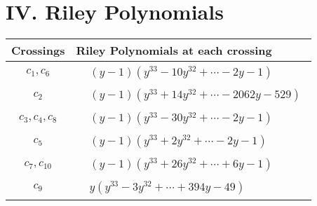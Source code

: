 \documentclass[1p]{elsarticle_modified}
\theoremstyle{definition}
\begin{document}
\centering \section*{ IV. Riley Polynomials}
\begin{tabular}{m{50pt}|m{274pt}}
Crossings & \hspace{64pt}Riley Polynomials at each crossing \\
\hline $$\begin{aligned}c_{1},c_{6}\end{aligned}$$&$\begin{aligned}
&(y-1)(y^{33}-10 y^{32}+\cdots-2 y-1)
\end{aligned}$\\
\hline $$\begin{aligned}c_{2}\end{aligned}$$&$\begin{aligned}
&(y-1)(y^{33}+14 y^{32}+\cdots-2062 y-529)
\end{aligned}$\\
\hline $$\begin{aligned}c_{3},c_{4},c_{8}\end{aligned}$$&$\begin{aligned}
&(y-1)(y^{33}-30 y^{32}+\cdots-2 y-1)
\end{aligned}$\\
\hline $$\begin{aligned}c_{5}\end{aligned}$$&$\begin{aligned}
&(y-1)(y^{33}+2 y^{32}+\cdots-2 y-1)
\end{aligned}$\\
\hline $$\begin{aligned}c_{7},c_{10}\end{aligned}$$&$\begin{aligned}
&(y-1)(y^{33}+26 y^{32}+\cdots+6 y-1)
\end{aligned}$\\
\hline $$\begin{aligned}c_{9}\end{aligned}$$&$\begin{aligned}
&y(y^{33}-3 y^{32}+\cdots+394 y-49)
\end{aligned}$\\
\hline
\end{tabular}
\vskip 2pc
\end{document}
